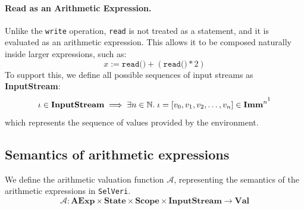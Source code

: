 \documentclass{article}
\begin{document}
\paragraph{Read as an Arithmetic Expression.}
Unlike the \texttt{write} operation, \texttt{read} is not treated as a statement, and it is evaluated as an arithmetic expression. This allows it to be composed naturally inside larger expressions, such as:
\[
    x := \texttt{read()} + (\texttt{read()} * 2)
\]
To support this, we define all possible sequences of input streams as \textbf{InputStream}:
\[
    \iota \in \textbf{InputStream}  \implies \exists n \in \mathbb{N}.\; \iota = [v_0, v_1, v_2, \dots, v_n] \in \textbf{Imm}^{n\footnotemark} 
\]
which represents the sequence of values provided by the environment.


\subsection{Semantics of arithmetic expressions}

We define the arithmetic valuation function $\mathcal{A}$, representing the semantics of the arithmetic expressions in \texttt{SelVeri}.
\[
\mathcal{A} : \textbf{AExp} \times \textbf{State} \times \textbf{Scope} \times \textbf{InputStream} \to \textbf{Val} 
\]
\end{document}
